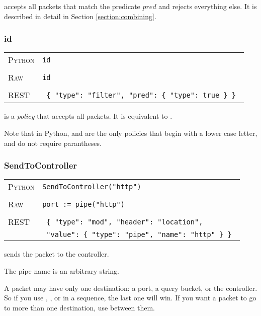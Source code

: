  accepts all packets that match the predicate $pred$ and rejects everything else.
It is described in detail in Section \ref{section:combining}.

\subsubsection{id}

\bigskip
\begin{tabularx}{\linewidth}{lX}
\textsc{Python}   & \texttt{id} \\ \\
\textsc{Raw}   & \texttt{id} \\ \\
\textsc{REST} & \texttt{ \{ "type": "filter", "pred": \{ "type": true \} \} } 
\end{tabularx}

 is a \emph{policy} that accepts all packets.  It is equivalent to .

Note that in Python,  and  are the only policies that begin with a lower case
letter, and do not require parantheses.  

\subsubsection{SendToController}

\bigskip
\begin{tabularx}{\linewidth}{lX}
\textsc{Python}   & \texttt{SendToController("http")} \\ \\
\textsc{Raw}    & \texttt{port := pipe("http")}     \\ \\
\textsc{REST} & \texttt{ \{ "type": "mod", "header": "location", } \\
 & \texttt{ "value": \{ "type": "pipe", "name": "http" \} \} } 
\end{tabularx}

 sends the packet to the controller.   

The pipe name is an arbitrary string. 

A packet may have only one destination: a port, a query bucket, or the controller.  So if you use 
, , or  in a sequence, the last one will
win.  If you want a packet to go to more than one destination, use  between them.    

